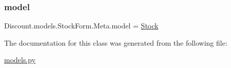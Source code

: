 \subsubsection{\texorpdfstring{model}{model}}
{\footnotesize\ttfamily Discount.\+models.\+Stock\+Form.\+Meta.\+model = \hyperlink{class_discount_1_1models_1_1_stock}{Stock}\hspace{0.3cm}{\ttfamily [static]}}



The documentation for this class was generated from the following file\+:\begin{DoxyCompactItemize}
\item 
\hyperlink{models_8py}{models.\+py}\end{DoxyCompactItemize}
